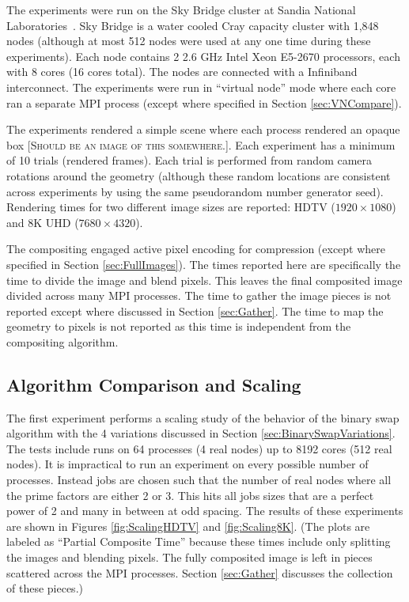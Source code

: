 \documentclass{vgtc}                          %
\newcommand*{\lcite}[1]{~\cite{#1}}
\newcommand{\fix}[1]{{\color{red}\textsc{[#1]}}}
\newcommand{\textalgorithm}[1]{\textsf{#1}\xspace}
\newcommand{\binaryswap}{\textalgorithm{binary swap}}
\begin{document}
The experiments were run on the Sky Bridge cluster at Sandia National Laboratories\lcite{SkyBridge}.
Sky Bridge is a water cooled Cray capacity cluster with 1,848 nodes (although at most 512 nodes were used at any one time during these experiments).
Each node contains 2 2.6 GHz Intel Xeon E5-2670 processors, each with 8 cores (16 cores total).
The nodes are connected with a Infiniband interconnect.
The experiments were run in ``virtual node'' mode where each core ran a separate MPI process (except where specified in Section \ref{sec:VNCompare}).

The experiments rendered a simple scene where each process rendered an opaque box \fix{Should be an image of this somewhere.}.
Each experiment has a minimum of 10 trials (rendered frames).
Each trial is performed from random camera rotations around the geometry (although these random locations are consistent across experiments by using the same pseudorandom number generator seed).
Rendering times for two different image sizes are reported: HDTV ($1920 \times 1080$) and 8K UHD ($7680 \times 4320$).

The compositing engaged active pixel encoding for compression (except where specified in Section \ref{sec:FullImages}).
The times reported here are specifically the time to divide the image and blend pixels.
This leaves the final composited image divided across many MPI processes.
The time to gather the image pieces is not reported except where discussed in Section \ref{sec:Gather}.
The time to map the geometry to pixels is not reported as this time is independent from the compositing algorithm.

\subsection{Algorithm Comparison and Scaling}
\label{sec:Scaling}

The first experiment performs a scaling study of the behavior of the \binaryswap algorithm with the 4 variations discussed in Section \ref{sec:BinarySwapVariations}.
The tests include runs on 64 processes (4 real nodes) up to 8192 cores (512 real nodes).
It is impractical to run an experiment on every possible number of processes.
Instead jobs are chosen such that the number of real nodes where all the prime factors are either 2 or 3.
This hits all jobs sizes that are a perfect power of 2 and many in between at odd spacing.
The results of these experiments are shown in Figures \ref{fig:ScalingHDTV} and \ref{fig:Scaling8K}.
(The plots are labeled as ``Partial Composite Time'' because these times include only splitting the images and blending pixels.
The fully composited image is left in pieces scattered across the MPI processes.
Section \ref{sec:Gather} discusses the collection of these pieces.)
\end{document}

